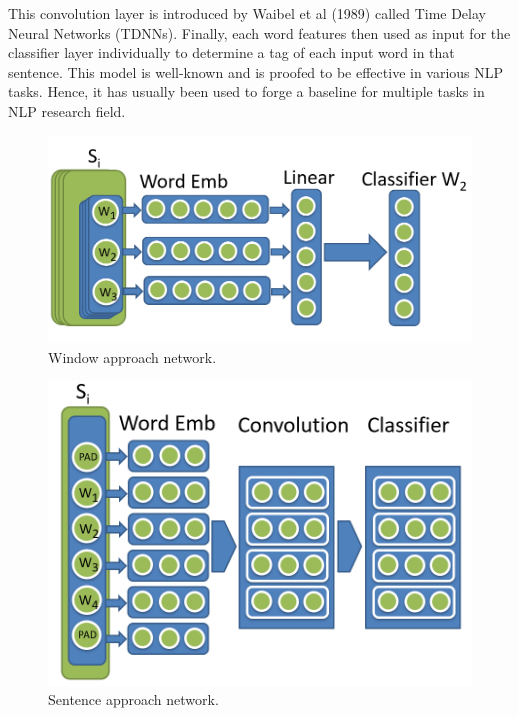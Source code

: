 This convolution layer is introduced by Waibel et al (1989) \cite{Waibel1989PhonemeRU} called Time Delay Neural Networks (TDNNs).
Finally, each word features then used as input for the classifier layer individually to determine a tag of each input word in that sentence. 
This model is well-known and is proofed to be effective in various NLP tasks. 
Hence, it has usually been used to forge a baseline for multiple tasks in NLP research field.
\begin{figure}[!h]
  \includegraphics[scale=0.5]{window_approach_network.png}
  \caption{Window approach network.}
  \label{fig:window_approach_network}
\end{figure}
\begin{figure}[!h]
  \includegraphics[scale=0.5]{sentence_approach_network.png}
  \caption{Sentence approach network.}
  \label{fig:sentence_approach_network}
\end{figure}


